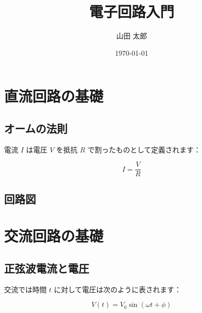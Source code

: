 \documentclass[12pt, oneside]{book}
\title{電子回路入門}
\author{山田 太郎}
\date{\today}
\begin{document}
\maketitle
\tableofcontents
\newpage

\chapter{直流回路の基礎}
\section{オームの法則}
電流 \( I \) は電圧 \( V \) を抵抗 \( R \) で割ったものとして定義されます：

\[
I = \frac{V}{R}
\]

\section{回路図}

\chapter{交流回路の基礎}
\section{正弦波電流と電圧}
交流では時間 \( t \) に対して電圧は次のように表されます：

\[
V(t) = V_0 \sin(\omega t + \phi)
\]
\end{document}
